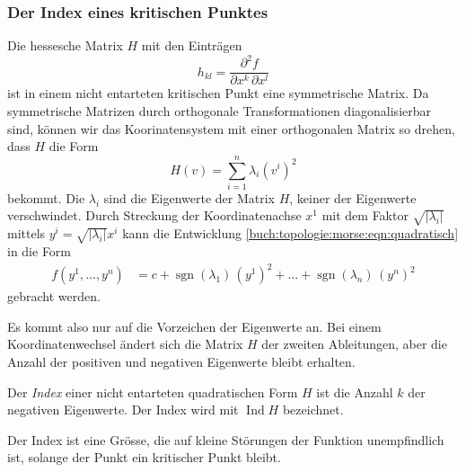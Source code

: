 %
%
\subsubsection{Der Index eines kritischen Punktes}
Die hessesche Matrix $H$ mit den Einträgen
\[
h_{kl} = \frac{\partial^2 f}{\partial x^k\,\partial x^l}
\]
ist in einem nicht entarteten kritischen Punkt eine symmetrische
Matrix.
Da symmetrische Matrizen durch orthogonale Transformationen
diagonalisierbar sind, können wir das Koorinatensystem mit
einer orthogonalen Matrix so drehen, dass $H$ die Form
\[
H(v)
=
\sum_{i=1}^n \lambda_i (v^i)^2
\]
bekommt.
Die $\lambda_i$ sind die Eigenwerte der Matrix $H$, keiner
der Eigenwerte verschwindet.
Durch Streckung der Koordinatenachse $x^1$ mit dem Faktor
$\!\sqrt{|\lambda_i|}$  mittels
$y^i = \!\sqrt{|\lambda_i|}x^i$ kann die Entwicklung
\eqref{buch:topologie:morse:eqn:quadratisch}
in die Form
\begin{align*}
f(y^1,\dots,y^n)
&=
c
+
\operatorname{sgn}(\lambda_1)\,(y^1)^2
+
\dots
+
\operatorname{sgn}(\lambda_n)\,(y^n)^2
\end{align*}
gebracht werden.

Es kommt also nur auf die Vorzeichen der Eigenwerte an.
Bei einem Koordinatenwechsel ändert sich die Matrix $H$ der zweiten
Ableitungen, aber die Anzahl der positiven und negativen Eigenwerte
bleibt erhalten.

\begin{definition}[Index]
%
Der \emph{Index} einer nicht entarteten quadratischen Form $H$ ist die
Anzahl $k$ der negativen Eigenwerte.
Der Index wird mit $\operatorname{Ind}H$ bezeichnet.
%
%
\end{definition}

Der Index ist eine Grösse, die auf kleine Störungen der Funktion
unempfindlich ist, solange der Punkt ein kritischer Punkt bleibt.

%
%
